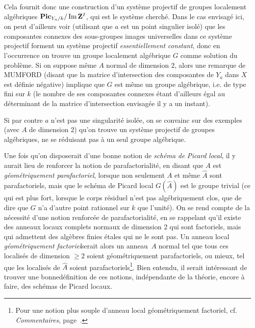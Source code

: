 Cela fournit donc une construction d'un syst\`eme projectif de groupes localement alg\'ebriques $\mathbf{Pic}_{Y_n/k}/\operatorname{Im} \mathbf{Z}^I$, qui est le syst\`eme cherch\'e. Dans le cas envisag\'e ici, on peut d'ailleurs voir (utilisant que $a$ est un point singulier isol\'e) que les composantes connexes des sous-groupes images universelles dans ce syst\`eme projectif forment un syst\`eme projectif \emph{essentiellement constant}, donc en l'occurrence on trouve un groupe localement alg\'ebrique $G$ comme solution du probl\`eme. Si on suppose m\^eme $A$ normal de dimension $2$, alors une remarque de MUMFORD (disant que la matrice d'intersection des composantes de $Y_{a}$ dans $X$ est d\'efinie n\'egative) implique que $G$ est m\^eme un groupe alg\'ebrique, i.e. de type fini sur $k$ (le nombre de ses composantes connexes \'etant d'ailleurs \'egal au d\'eterminant de la matrice d'intersection envisag\'ee il y a un instant).

Si par contre $a$ n'est pas une singularit\'e isol\'ee, on se convainc sur des exemples (avec $A$ de dimension $2$) qu'on trouve un syst\`eme projectif de groupes alg\'ebriques, ne se r\'eduisant pas \`a un seul groupe alg\'ebrique.

\label{pXIII20}%
Une fois qu'on disposerait d'une bonne notion de \og \emph{schéma de Picard local}\fg, il y aurait lieu de renforcer la notion de parafactorialit\'e, en disant que $A$ est \og \emph{géométriquement parafactoriel}\fg, lorsque non seulement $A$ et m\^eme $\widehat{A}$ sont parafactoriels, mais que le sch\'ema de Picard local $G(\widehat{A})$ est le groupe trivial (ce qui est plus fort, lorsque le corps r\'esiduel n'est pas alg\'ebriquement clos, que de dire que $G$ n'a d'autre point rationnel sur $k$ que l'unit\'e). On se rend compte de la n\'ecessit\'e d'une notion renforc\'ee de parafactorialit\'e, en se rappelant qu'il existe des anneaux locaux complets normaux de dimension $2$ qui sont factoriels, mais qui admettent des alg\`ebres finies \'etales qui ne le sont pas. Un anneau local \og \emph{géométriquement factoriel}\fg serait alors un anneau~$A$ normal tel que tous ces localis\'es de dimension $\geq 2$ soient g\'eom\'etriquement parafactoriels, ou mieux, tel que les localis\'es de $\widehat{A}$ soient parafactoriels\footnote{Pour une notion plus souple d'anneau local \og g\'eom\'etriquement factoriel\fg, cf. \emph{Commentaires}, page~\pageref{commpara}.}. Bien entendu, il serait int\'eressant de trouver une \og bonne\fg d\'efinition de ces notions, ind\'ependante de la th\'eorie, encore \`a faire, des sch\'emas de Picard locaux.

